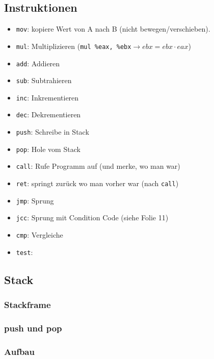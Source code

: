 \subsection{Instruktionen}
\begin{itemize}
\item \lstinline`mov`: kopiere Wert von A nach B (nicht bewegen/verschieben). 
\item \lstinline`mul`: Multiplizieren (\lstinline`mul %eax, %ebx`$\to ebx = ebx \cdot eax$)
\item \lstinline`add`: Addieren
\item \lstinline`sub`: Subtrahieren
\item \lstinline`inc`: Inkrementieren
\item \lstinline`dec`: Dekrementieren
\item \lstinline`push`: Schreibe in Stack
\item \lstinline`pop`: Hole vom Stack
\item \lstinline`call`: Rufe Programm auf (und merke, wo man war)
\item \lstinline`ret`: springt zurück wo man vorher war (nach \lstinline`call`)
\item \lstinline`jmp`: Sprung
\item \lstinline`jcc`: Sprung mit Condition Code (siehe Folie 11)
\item \lstinline`cmp`:  Vergleiche
\item \lstinline`test`:
\end{itemize}

\subsection{Stack}
\subsubsection*{Stackframe}
\subsubsection{push und pop}
\subsubsection*{Aufbau}

